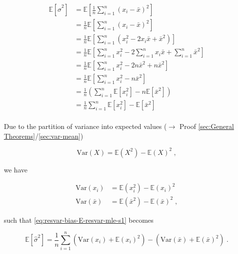 \documentclass[a4paper,12pt,twoside]{book}
\begin{document}
\begin{equation} \label{eq:resvar-bias-E-resvar-mle-s1}
\begin{split}
\mathbb{E}\left[ \hat{\sigma}^2 \right] &= \mathbb{E}\left[ \frac{1}{n} \sum_{i=1}^{n} \left( x_i - \bar{x} \right)^2 \right] \\
&= \frac{1}{n} \mathbb{E}\left[ \sum_{i=1}^{n} \left( x_i - \bar{x} \right)^2 \right] \\
&= \frac{1}{n} \mathbb{E}\left[ \sum_{i=1}^{n} \left( x_i^2 - 2 x_i \bar{x} + \bar{x}^2 \right) \right] \\
&= \frac{1}{n} \mathbb{E}\left[ \sum_{i=1}^{n} x_i^2 - 2 \sum_{i=1}^{n} x_i \bar{x} + \sum_{i=1}^{n} \bar{x}^2 \right] \\
&= \frac{1}{n} \mathbb{E}\left[ \sum_{i=1}^{n} x_i^2 - 2 n \bar{x}^2 + n \bar{x}^2 \right] \\
&= \frac{1}{n} \mathbb{E}\left[ \sum_{i=1}^{n} x_i^2 - n \bar{x}^2 \right] \\
&= \frac{1}{n} \left( \sum_{i=1}^{n} \mathbb{E} \left[ x_i^2 \right] - n \mathbb{E}\left[ \bar{x}^2 \right] \right) \\
&= \frac{1}{n} \sum_{i=1}^{n} \mathbb{E} \left[ x_i^2 \right] - \mathbb{E}\left[ \bar{x}^2 \right] \\
\end{split}
\end{equation}

Due to the partition of variance into expected values ($\rightarrow$ Proof \ref{sec:General Theorems}/\ref{sec:var-mean})

\begin{equation} \label{eq:resvar-bias-var-mean}
\mathrm{Var}(X) = \mathbb{E}(X^2) - \mathbb{E}(X)^2 \; ,
\end{equation}

we have

\begin{equation} \label{eq:resvar-bias-Var-xi-xb}
\begin{split}
\mathrm{Var}(x_i) &= \mathbb{E}(x_i^2) - \mathbb{E}(x_i)^2 \\
\mathrm{Var}(\bar{x}) &= \mathbb{E}(\bar{x}^2) - \mathbb{E}(\bar{x})^2 \; ,
\end{split}
\end{equation}

such that \eqref{eq:resvar-bias-E-resvar-mle-s1} becomes

\begin{equation} \label{eq:resvar-bias-E-resvar-mle-s2}
\mathbb{E}\left[ \hat{\sigma}^2 \right] = \frac{1}{n} \sum_{i=1}^{n} \left( \mathrm{Var}(x_i) + \mathbb{E}(x_i)^2 \right) - \left( \mathrm{Var}(\bar{x}) + \mathbb{E}(\bar{x})^2 \right) \; .
\end{equation}
\end{document}
